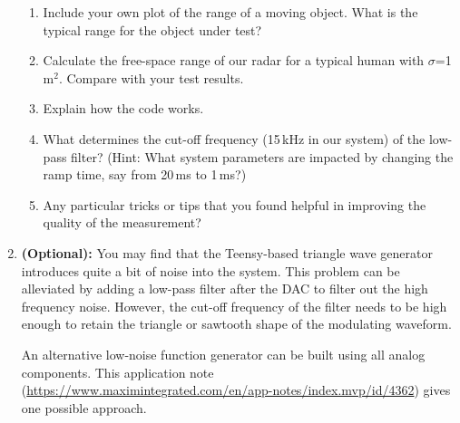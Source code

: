 \documentclass[letterpaper, 11pt]{article}
\begin{document}
\begin{enumerate}
\begin{enumerate}
			\item Include your own plot of the range of a moving object. What is the typical range for the object under test? 
			
			\item Calculate the free-space range of our radar for a typical human with $\sigma$=1\,m$^2$. Compare with your test results.
			
			\item Explain how the code works. 
			
			\item What determines the cut-off frequency (15\,kHz in our system) of the low-pass filter? (Hint: What system parameters are impacted by changing the ramp time, say from 20\,ms to 1\,ms?)
						
			\item Any particular tricks or tips that you found helpful in improving the quality of the measurement? 
						
		\end{enumerate} 
	
	\item \textbf{(Optional):} You may find that the Teensy-based triangle wave generator introduces quite a bit of noise into the system. This problem can be alleviated by adding a low-pass filter after the DAC to filter out the high frequency noise. However, the cut-off frequency of the filter needs to be high enough to retain the triangle or sawtooth shape of the modulating waveform. 
	
	An alternative low-noise function generator can be built using all analog components. This application note (\url{https://www.maximintegrated.com/en/app-notes/index.mvp/id/4362}) gives one possible approach. 
	
	
\end{enumerate}
%
\end{document}
